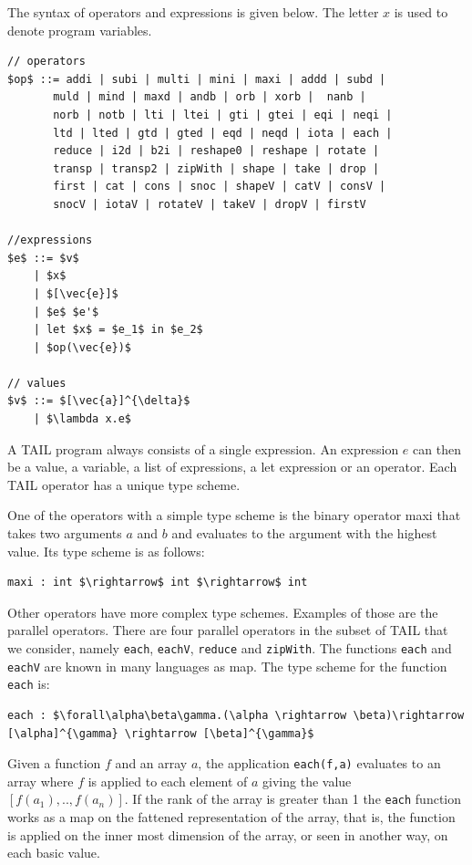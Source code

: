 \documentclass[11pt]{article}
\begin{document}
The syntax of operators and expressions is given below.
The letter $x$ is used to denote program variables. 
\begin{lstlisting}[numbers=none,frame=none]
// operators
$op$ ::= addi | subi | multi | mini | maxi | addd | subd | 
       muld | mind | maxd | andb | orb | xorb |  nanb | 
       norb | notb | lti | ltei | gti | gtei | eqi | neqi |
       ltd | lted | gtd | gted | eqd | neqd | iota | each |
       reduce | i2d | b2i | reshape0 | reshape | rotate |
       transp | transp2 | zipWith | shape | take | drop |
       first | cat | cons | snoc | shapeV | catV | consV | 
       snocV | iotaV | rotateV | takeV | dropV | firstV 

//expressions
$e$ ::= $v$ 
    | $x$ 
    | $[\vec{e}]$ 
    | $e$ $e'$ 
    | let $x$ = $e_1$ in $e_2$ 
    | $op(\vec{e})$

// values
$v$ ::= $[\vec{a}]^{\delta}$
    | $\lambda x.e$
\end{lstlisting}
A TAIL program always consists of a single expression.
An expression $e$ can then be a value, a variable, a list of expressions, a let expression or an operator.
Each TAIL operator has a unique type scheme.

One of the operators with a simple type scheme is the binary operator maxi that takes two arguments $a$ and $b$ and evaluates to the argument with the highest value. Its type scheme is as follows:
\begin{lstlisting}[numbers=none,frame=none]
maxi : int $\rightarrow$ int $\rightarrow$ int
\end{lstlisting}

Other operators have more complex type schemes. Examples of those are the parallel operators. 
There are four parallel operators in the subset of TAIL that we consider, namely {\tt each}, {\tt eachV}, {\tt reduce} and {\tt zipWith}.
The functions {\tt each} and {\tt eachV} are known in many languages as map.
The type scheme for the function {\tt each} is:
\begin{lstlisting}[numbers=none,frame=none]
each : $\forall\alpha\beta\gamma.(\alpha \rightarrow \beta)\rightarrow [\alpha]^{\gamma} \rightarrow [\beta]^{\gamma}$
\end{lstlisting}
Given a function $f$ and an array $a$, the application {\tt each(f,a)} evaluates to an array where $f$ is applied to each element of $a$ giving the value $[f(a_1),..,f(a_n)]$.
If the rank of the array is greater than 1 the {\tt each} function works as a map on the fattened representation of the array,
that is, the function is applied on the inner most dimension of the array, or seen in another way, on each basic value.
\end{document}
